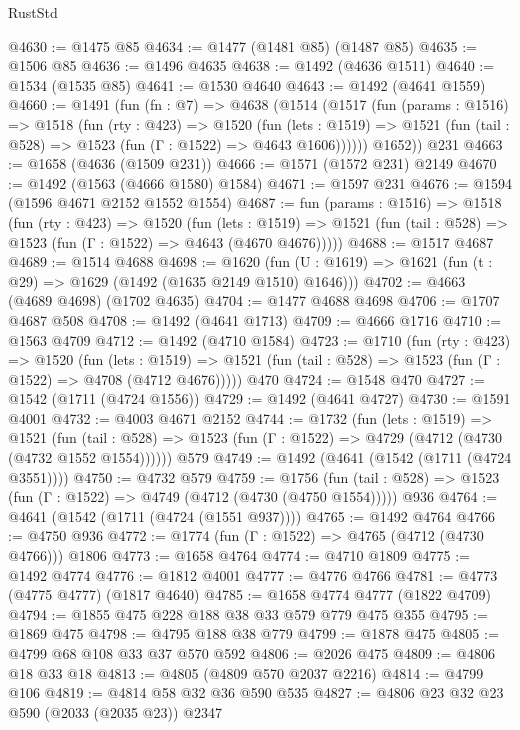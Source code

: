 \begin{lexlean}{RustStd}
\begin{coremodule}
@4630 := @1475 @85
@4634 := @1477 (@1481 @85) (@1487 @85)
@4635 := @1506 @85
@4636 := @1496 @4635
@4638 := @1492 (@4636 @1511)
@4640 := @1534 (@1535 @85)
@4641 := @1530 @4640
@4643 := @1492 (@4641 @1559)
@4660 := @1491
    (fun (fn : @7) =>
    @4638
      (@1514
        (@1517
          (fun (params : @1516) =>
          @1518
            (fun (rty : @423) =>
            @1520
              (fun (lets : @1519) =>
              @1521 (fun (tail : @528) => @1523 (fun (Γ : @1522) => @4643 @1606))))))
        @1652))
    @231
@4663 := @1658 (@4636 (@1509 @231))
@4666 := @1571 (@1572 @231) @2149
@4670 := @1492 (@1563 (@4666 @1580) @1584)
@4671 := @1597 @231
@4676 := @1594 (@1596 @4671 @2152 @1552 @1554)
@4687 := fun (params : @1516) =>
  @1518
    (fun (rty : @423) =>
    @1520
      (fun (lets : @1519) =>
      @1521 (fun (tail : @528) => @1523 (fun (Γ : @1522) => @4643 (@4670 @4676)))))
@4688 := @1517 @4687
@4689 := @1514 @4688
@4698 := @1620 (fun (U : @1619) => @1621 (fun (t : @29) => @1629 (@1492 (@1635 @2149 @1510) @1646)))
@4702 := @4663 (@4689 @4698) (@1702 @4635)
@4704 := @1477 @4688 @4698
@4706 := @1707 @4687 @508
@4708 := @1492 (@4641 @1713)
@4709 := @4666 @1716
@4710 := @1563 @4709
@4712 := @1492 (@4710 @1584)
@4723 := @1710
    (fun (rty : @423) =>
    @1520
      (fun (lets : @1519) =>
      @1521 (fun (tail : @528) => @1523 (fun (Γ : @1522) => @4708 (@4712 @4676)))))
    @470
@4724 := @1548 @470
@4727 := @1542 (@1711 (@4724 @1556))
@4729 := @1492 (@4641 @4727)
@4730 := @1591 @4001
@4732 := @4003 @4671 @2152
@4744 := @1732
    (fun (lets : @1519) =>
    @1521
      (fun (tail : @528) => @1523 (fun (Γ : @1522) => @4729 (@4712 (@4730 (@4732 @1552 @1554))))))
    @579
@4749 := @1492 (@4641 (@1542 (@1711 (@4724 @3551))))
@4750 := @4732 @579
@4759 := @1756
    (fun (tail : @528) => @1523 (fun (Γ : @1522) => @4749 (@4712 (@4730 (@4750 @1554)))))
    @936
@4764 := @4641 (@1542 (@1711 (@4724 (@1551 @937))))
@4765 := @1492 @4764
@4766 := @4750 @936
@4772 := @1774 (fun (Γ : @1522) => @4765 (@4712 (@4730 @4766))) @1806
@4773 := @1658 @4764
@4774 := @4710 @1809
@4775 := @1492 @4774
@4776 := @1812 @4001
@4777 := @4776 @4766
@4781 := @4773 (@4775 @4777) (@1817 @4640)
@4785 := @1658 @4774 @4777 (@1822 @4709)
@4794 := @1855 @475 @228 @188 @38 @33 @579 @779 @475 @355
@4795 := @1869 @475
@4798 := @4795 @188 @38 @779
@4799 := @1878 @475
@4805 := @4799 @68 @108 @33 @37 @570 @592
@4806 := @2026 @475
@4809 := @4806 @18 @33 @18
@4813 := @4805 (@4809 @570 @2037 @2216)
@4814 := @4799 @106
@4819 := @4814 @58 @32 @36 @590 @535
@4827 := @4806 @23 @32 @23 @590 (@2033 (@2035 @23)) @2347

\end{coremodule}
\end{lexlean}
